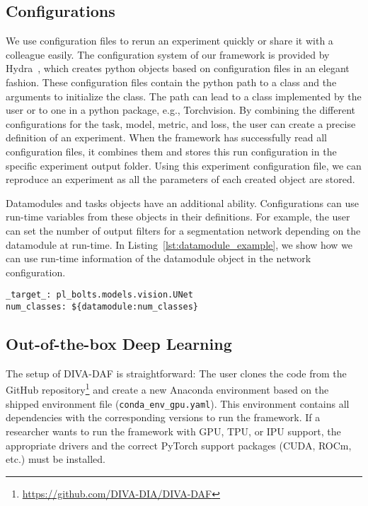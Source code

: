 \documentclass[runningheads]{llncs}
\begin{document}
\subsection{Configurations}\label{subsec:configs}
We use configuration files to rerun an experiment quickly or share it with a colleague easily.
The configuration system of our framework is provided by Hydra~\cite{yadanHydraFrameworkElegantly2019}, which creates python objects based on configuration files in an elegant fashion.
These configuration files contain the python path to a class and the arguments to initialize the class.
The path can lead to a class implemented by the user or to one in a python package, e.g., Torchvision.
By combining the different configurations for the task, model, metric, and loss, the user can create a precise definition of an experiment. 
When the framework has successfully read all configuration files, it combines them and stores this run configuration in the specific experiment output folder.
Using this experiment configuration file, we can reproduce an experiment as all the parameters of each created object are stored.

Datamodules and tasks objects have an additional ability. 
Configurations can use run-time variables from these objects in their definitions.
For example, the user can set the number of output filters for a segmentation network depending on the datamodule at run-time.
In Listing~\ref{lst:datamodule_example}, we show how we can use run-time information of the datamodule object in the network configuration.



\begin{lstlisting}[frame=single, caption={Usage of the datamodule variable \texttt{num\_classes} which is set during run-time.}, label={lst:datamodule_example}]
_target_: pl_bolts.models.vision.UNet
num_classes: ${datamodule:num_classes}
\end{lstlisting}


\subsection{Out-of-the-box Deep Learning}\label{subsec:outofthebox}
The setup of DIVA-DAF is straightforward: The user clones the code from the GitHub repository\footnote{\url{https://github.com/DIVA-DIA/DIVA-DAF}} and create a new Anaconda\cite{anaconda} environment based on the shipped environment file (\texttt{conda\_env\_gpu.yaml}).
This environment contains all dependencies with the corresponding versions to run the framework.
If a researcher wants to run the framework with GPU, TPU, or IPU support, the appropriate drivers and the correct PyTorch support packages (CUDA, ROCm, etc.) must be installed.
\end{document}
